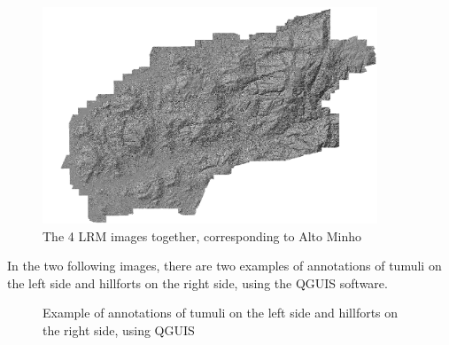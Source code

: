 \begin{figure}[H]
\centering
\includegraphics[width=10cm]{images/LRMfinal.png}
\caption{The 4 LRM images together, corresponding to Alto Minho}
\end{figure}
In the two following images, there are two examples of annotations of tumuli on the left side and hillforts on the right side, using the QGUIS software.
\begin{figure}[H]
    \centering
    \qquad
    \caption{Example of annotations of tumuli on the left side and hillforts on the right side, using QGUIS}%
\end{figure}




